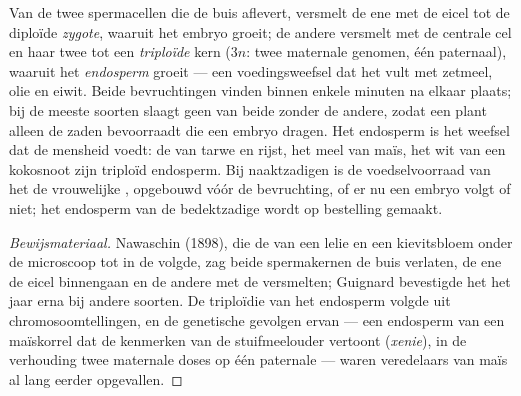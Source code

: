 \begin{proposition}\label{prop:b2:angiosperm-reproduction:double}
Van de twee spermacellen die de buis aflevert, versmelt de ene met de
eicel tot de diploïde \emph{zygote}, waaruit het embryo groeit; de andere
versmelt met de centrale cel en haar twee  tot een
\emph{triploïde} kern ($3n$: twee maternale genomen, één paternaal),
waaruit het \emph{endosperm} groeit --- een voedingsweefsel dat het 
vult met zetmeel, olie en eiwit. Beide bevruchtingen vinden binnen enkele
minuten na elkaar plaats; bij de meeste soorten slaagt geen van beide
zonder de andere, zodat een plant alleen de zaden bevoorraadt die een
embryo dragen. Het endosperm is het weefsel dat de mensheid voedt: de
 van tarwe en rijst, het meel van maïs, het wit van een kokosnoot
zijn triploïd endosperm. Bij naaktzadigen is de voedselvoorraad van het
 de vrouwelijke , opgebouwd vóór de bevruchting, of er nu een
embryo volgt of niet; het endosperm van de bedektzadige wordt op bestelling
gemaakt.
\end{proposition}
\begin{proof}[Bewijsmateriaal]
Nawaschin (1898), die de  van een lelie en een kievitsbloem
onder de microscoop tot in de  volgde, zag beide spermakernen de
buis verlaten, de ene de eicel binnengaan en de andere met de 
versmelten; Guignard bevestigde het het jaar erna bij andere soorten. De
triploïdie van het endosperm volgde uit chromosoomtellingen, en de
genetische gevolgen ervan --- een endosperm van een maïskorrel dat de
kenmerken van de stuifmeelouder vertoont (\emph{xenie}), in de verhouding
twee maternale doses op één paternale --- waren veredelaars van maïs al
lang eerder opgevallen.
\end{proof}

